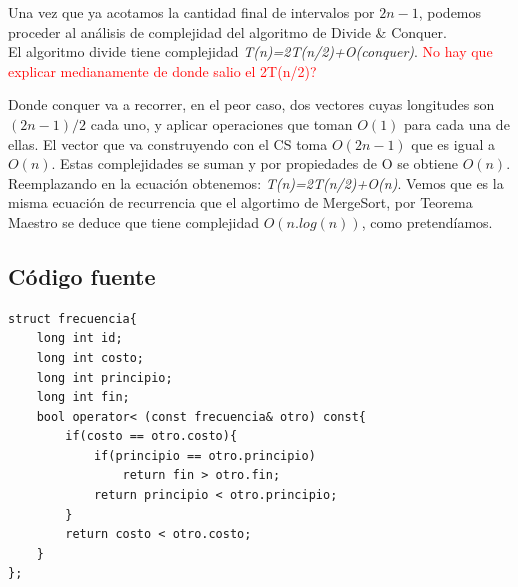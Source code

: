 Una vez que ya acotamos la cantidad final de intervalos por $2n-1$, podemos proceder al an\'alisis de complejidad del algoritmo de Divide \& Conquer.\\

El algoritmo divide tiene complejidad \emph{T(n)=2T(n/2)+O(conquer)}. \textcolor{red}{No hay que explicar medianamente de donde salio el 2T(n/2)?}

Donde conquer va a recorrer, en el peor caso, dos vectores cuyas longitudes son $(2n-1)/2$ cada uno, y aplicar operaciones que toman $O(1)$ para cada una de ellas. El vector que va construyendo con el CS toma $O(2n-1)$ que es igual a $O(n)$. Estas complejidades se suman y por propiedades de O se obtiene $O(n)$.\\

Reemplazando en la ecuaci\'on obtenemos: \emph{T(n)=2T(n/2)+O(n)}. Vemos que es la misma ecuaci\'on de recurrencia que el algortimo de MergeSort, por Teorema Maestro se deduce que tiene complejidad $O(n.log(n))$, como pretend\'iamos.

\newpage
\subsection{C\'odigo fuente}



	\begin{codesnippet}
	\begin{verbatim}
struct frecuencia{
    long int id;
    long int costo;
    long int principio;
    long int fin;
    bool operator< (const frecuencia& otro) const{
        if(costo == otro.costo){
            if(principio == otro.principio)
                return fin > otro.fin;
            return principio < otro.principio;
        }
        return costo < otro.costo;
    }
};
	\end{verbatim}
	\end{codesnippet}
	
